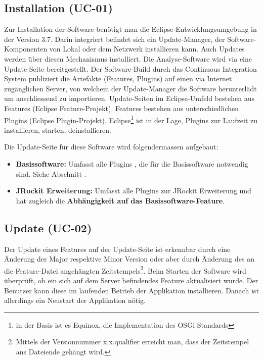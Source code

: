 \subsection{Installation (UC-01)}\label{installation}
Zur Installation der Software benötigt man die Eclipse-Entwicklungsumgebung in der Version 3.7. Darin integriert befindet sich ein Update-Manager, der Software-Komponenten von Lokal oder dem Netzwerk installieren kann. Auch Updates werden über diesen Mechanismus installiert. Die Analyse-Software wird via eine Update-Seite bereitgestellt. Der Software-Build durch das Continuous Integration System publiziert die Artefakte (Features, Plugins) auf einen via Internet zugänglichen Server, von welchem der Update-Manager die Software herunterlädt um anschliessend zu importieren. Update-Seiten im Eclipse-Umfeld bestehen aus Features (Eclipse Feature-Projekt). Features bestehen aus unterschiedlichen Plugins (Eclipse Plugin-Projekt). Eclipse\footnote{in der Basis ist es Equinox, die Implementation des OSGi Standards} ist in der Lage, Plugins zur Laufzeit zu installieren, starten, deinstallieren.

Die Update-Seite für diese Software wird folgendermassen aufgebaut:
\begin{itemize}
\item \textbf{Basissoftware:} Umfasst alle Plugins , die für die Basissoftware notwendig sind. Siehe Abschnitt .
\item \textbf{JRockit Erweiterung: }Umfasst alle Plugins zur JRockit Erweiterung und hat zugleich die \textbf{Abhängigkeit auf das Basissoftware-Feature}.
\end{itemize}

\subsection{Update (UC-02)}
Der Update eines Features auf der Update-Seite ist erkennbar durch eine Änderung der Major respektive Minor Version oder aber durch Änderung des an die Feature-Datei angehängten Zeitstempels\footnote{Mittels der Versionnummer x.x.qualifier erreicht man, dass der Zeitstempel ans Dateiende gehängt wird.}. Beim Starten der Software wird überprüft, ob ein sich auf dem Server befindendes Feature aktualisiert wurde. Der Benutzer kann diese im laufenden Betrieb der Applikation installieren. Danach ist allerdings ein Neustart der Applikation nötig. 

